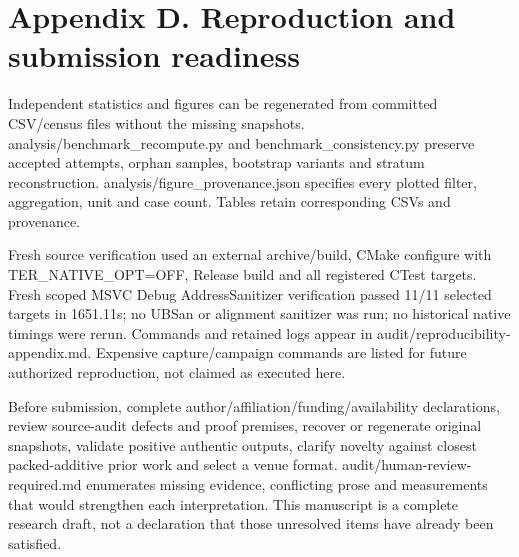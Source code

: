 \documentclass[10pt,letterpaper]{article}
\begin{document}
\section*{Appendix D. Reproduction and submission readiness}

Independent statistics and figures can be regenerated from committed CSV/census files without the missing snapshots. analysis/benchmark\_recompute.py and benchmark\_consistency.py preserve accepted attempts, orphan samples, bootstrap variants and stratum reconstruction. analysis/figure\_provenance.json specifies every plotted filter, aggregation, unit and case count. Tables retain corresponding CSVs and provenance.


Fresh source verification used an external archive/build, CMake configure with TER\_NATIVE\_OPT=OFF, Release build and all registered CTest targets. Fresh scoped MSVC Debug AddressSanitizer verification passed 11/11 selected targets in 1651.11s; no UBSan or alignment sanitizer was run; no historical native timings were rerun. Commands and retained logs appear in audit/reproducibility-appendix.md. Expensive capture/campaign commands are listed for future authorized reproduction, not claimed as executed here.


Before submission, complete author/affiliation/funding/availability declarations, review source-audit defects and proof premises, recover or regenerate original snapshots, validate positive authentic outputs, clarify novelty against closest packed-additive prior work and select a venue format. audit/human-review-required.md enumerates missing evidence, conflicting prose and measurements that would strengthen each interpretation. This manuscript is a complete research draft, not a declaration that those unresolved items have already been satisfied.
\end{document}

